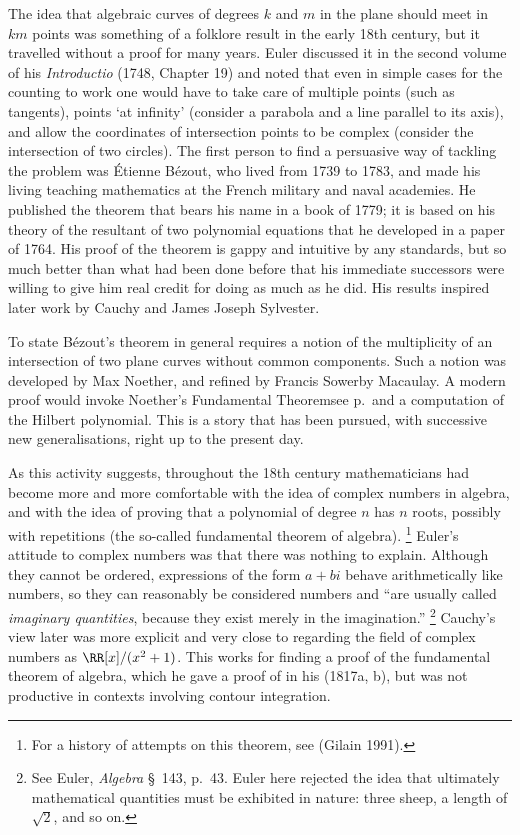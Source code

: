 The idea that algebraic curves of degrees $k$ and $m$ in the plane should
meet in $km$ points was something of a folklore result in the early
18th century, but it travelled without a proof for many years. Euler
discussed it in the second volume of his  \emph{Introductio} (1748,
Chapter 19) and noted that even in simple cases  for the counting to
work one would have to take care of multiple points (such as tangents),
points `at infinity' (consider a parabola and a line parallel to its
axis), and allow the  coordinates of intersection points to be complex
(consider the intersection of two circles). The first person to find
a persuasive way of tackling the problem was \'Etienne B\'ezout, who
lived from 1739 to 1783, and made his living teaching mathematics at
the French military and naval academies. He published the theorem that
bears his name in a book of 1779; it is based on his theory of the
resultant of two polynomial equations that he developed in a paper of
1764. His proof of the theorem is gappy and intuitive by any standards,
but so much better than what had been done before that his immediate
successors were willing to give him real credit for doing as much as he
did. His results inspired later work by Cauchy and James Joseph Sylvester.

To state  B\'ezout's theorem in general requires a notion of the
multiplicity of an intersection of two plane curves without common
components. Such a notion was developed by Max Noether, and refined
by Francis Sowerby Macaulay. A modern proof would invoke Noether's
Fundamental Theorem\emdash see p.~\pageref{Noether'sFT}\emdash and a
computation of the Hilbert polynomial. This is a story that  has been
pursued, with successive new generalisations, right up to the present day.


As this activity suggests, throughout the 18th century mathematicians
had become more and more comfortable with the idea of complex numbers in
algebra, and with the idea of proving that a polynomial of degree $n$ has
$n$ roots, possibly with repetitions (the so-called fundamental theorem
of algebra).%
%
\footnote{For a history of attempts on this theorem, see (Gilain 1991).} 
%
Euler's attitude to complex numbers was that there was
nothing to explain. Although they cannot be ordered, expressions of the
form $a+bi$  behave arithmetically like numbers, so they can reasonably be
considered numbers  and ``are usually called \emph{imaginary quantities},
because they exist merely in the imagination.''%
\footnote{See Euler,
\emph{Algebra} \S\, 143, p.~43. Euler here rejected the idea that
ultimately mathematical quantities must be exhibited in nature: three
sheep, a length of $\sqrt{2}$, and so on.}%
%
Cauchy's view later was more
explicit and very close to regarding  the field of complex numbers as
$\RR [x]/(x^2 + 1)$. This works for finding a proof of the fundamental
theorem of algebra, which he gave a proof of in his (1817a, b), but was
not productive in contexts involving contour integration.

